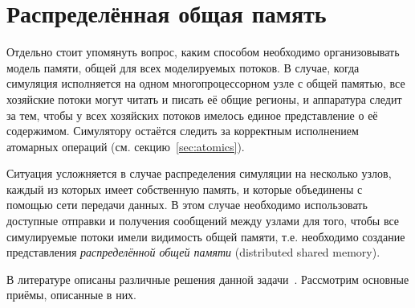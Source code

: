 \section{Распределённая общая память}

Отдельно стоит упомянуть вопрос, каким способом необходимо организовывать модель памяти, общей для всех моделируемых потоков. В случае, когда симуляция исполняется на одном многопроцессорном узле с общей памятью, все хозяйские потоки могут читать и писать её общие регионы, и аппаратура следит за тем, чтобы у всех хозяйских потоков имелось единое представление о её содержимом. Симулятору остаётся следить за корректным исполнением атомарных операций (см. секцию~\ref{sec:atomics}).

Ситуация усложняется в случае распределения симуляции на несколько узлов, каждый из которых имеет собственную память, и которые объединены с помощью сети передачи данных. В этом случае необходимо использовать доступные отправки и получения сообщений между узлами для того, чтобы все симулируемые потоки имели видимость общей памяти, т.е. необходимо создание представления \textit{распределённой общей памяти} (\abbr distributed shared memory).

В литературе описаны различные решения данной задачи~\cite{Bugnion97disco:running, graphite2010}. Рассмотрим основные приёмы, описанные в них.

%     
%     
%     
% 

